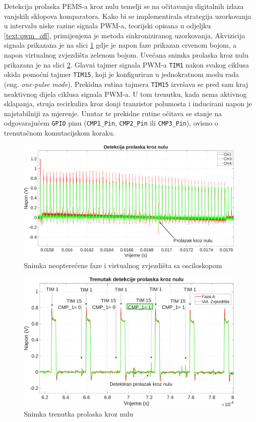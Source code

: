 \documentclass[diplomskirad]{fer}
\begin{document}
Detekcija prolaska PEMS-a kroz nulu temelji se na očitavanju digitalnih izlaza
vanjskih sklopova komparatora. Kako bi se implementirala strategija uzorkovanja
u intervalu niske razine signala PWM-a, teorijski opisana u odjeljku
\ref{text:pwm_off}, primijenjena je metoda sinkroniziranog uzorkovanja.
Akvizicija signala prikazana je na slici \ref{fig:zc} gdje je napon faze
prikazan crvenom bojom, a napon virtualnog zvjezdišta zelenom bojom. Uvećana
snimka prolaska kroz nulu prikazana je na slici \ref{fig:zc_zoom}. Glavni
tajmer signala PWM-a \texttt{TIM1} nakon svakog ciklusa okida pomoćni tajmer
\texttt{TIM15}, koji je konfiguriran u jednokratnom modu rada (eng.
\textit{one-pulse mode}). Prekidna rutina tajmera \texttt{TIM15} izvršava se
pred sam kraj neaktivnog dijela ciklusa signala PWM-a. U tom trenutku, kada
nema aktivnog sklapanja, struja recirkulira kroz donji tranzistor polumosta i
inducirani napon je najstabilniji za mjerenje. Unutar te prekidne rutine
očitava se stanje na odgovarajućem \texttt{GPIO} pinu (\texttt{CMP1\_Pin},
\texttt{CMP2\_Pin} ili \texttt{CMP3\_Pin}), ovisno o trenutačnom komutacijskom
koraku.

\begin{figure}[h!]
	\centering
	\includegraphics[width=\textwidth]{csv/zc.pdf}
	\caption{Snimka neopterećene faze i virtualnog zvjezdišta sa osciloskopom}
	\label{fig:zc}
\end{figure}

\begin{figure}[h!]
	\centering
	\includegraphics[width=\textwidth]{csv/zc_zoom.pdf}
	\caption{Snimka trenutka prolaska kroz nulu}
	\label{fig:zc_zoom}
\end{figure}
\end{document}
